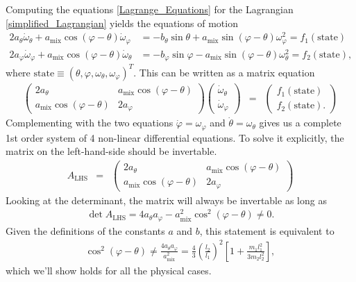 \documentclass[a4paper]{article}
\begin{document}
	Computing the equations \eqref{Lagrange_Equations} for the Lagrangian \eqref{simplified_Lagrangian} yields the equations of motion
	\begin{eqnarray}\label{eom_1}
		2 a_{\theta} \dot{\omega}_{\theta} + a_{\mathrm{mix}}\cos( \varphi - \theta ) \dot{\omega}_{\varphi} & = - b_{\theta}\sin{\theta} + a_{\mathrm{mix}}\sin( \varphi - \theta )\omega^2_{\varphi} = f_1( \mathrm{state} ) \\ \label{eom_2}
		2 a_{\varphi} \dot{\omega}_{\varphi} + a_{\mathrm{mix}}\cos( \varphi - \theta ) \dot{\omega}_{\theta} & = - b_{\varphi}\sin{\varphi} - a_{\mathrm{mix}}\sin( \varphi - \theta )\omega^2_{\theta} = f_2( \mathrm{state} ),
	\end{eqnarray}
	where $\mathrm{state} \equiv ( \theta , \varphi , \omega_{\theta} , \omega_{\varphi} )^T$.
	This can be written as a matrix equation
	\begin{eqnarray}
		\begin{pmatrix}
			2 a_{\theta} & a_{\mathrm{mix}}\cos( \varphi - \theta ) \\
			a_{\mathrm{mix}}\cos( \varphi - \theta ) & 2 a_{\varphi} 
		\end{pmatrix} 
		\begin{pmatrix}
			\dot{\omega}_{\theta} \\
			\dot{\omega}_{\varphi}
		\end{pmatrix} 
		& = & 
		\begin{pmatrix}
			f_1( \mathrm{state} ) \\
			f_2( \mathrm{state} ).
		\end{pmatrix}
	\end{eqnarray}
	Complementing with the two equations $\dot{\varphi} = \omega_{\varphi}$ and $\dot{\theta} = \omega_{\theta}$ gives us a complete 1st order system of 4 non-linear differential equations.
	To solve it explicitly, the matrix on the left-hand-side should be invertable.
	\begin{eqnarray}
		A_{\mathrm{LHS}} & = &
		\begin{pmatrix}
			2 a_{\theta} & a_{\mathrm{mix}}\cos( \varphi - \theta ) \\
			a_{\mathrm{mix}}\cos( \varphi - \theta ) & 2 a_{\varphi} 
		\end{pmatrix} 
	\end{eqnarray}
	Looking at the determinant, the matrix will always be invertable as long as
	\begin{eqnarray}
		\det{ A_{\mathrm{LHS}} } = 4 a_{\theta} a_{\varphi} - a^2_{\mathrm{mix}} \cos^2( \varphi - \theta ) \neq 0.
	\end{eqnarray}
	Given the definitions of the constants $a$ and $b$, this statement is equivalent to
	\begin{eqnarray}
		\cos^2( \varphi - \theta ) \neq \frac{ 4a_{\theta} a_{\varphi} }{ a^2_{\mathrm{mix}} } = \frac{4}{3} \left( \frac{ l_2 }{ l_1 } \right)^2 \left[ 1 + \frac{m_1 l_1^2}{3 m_2 l_2^2} \right],
	\end{eqnarray}
	which we'll show holds for all the physical cases.
\end{document}
